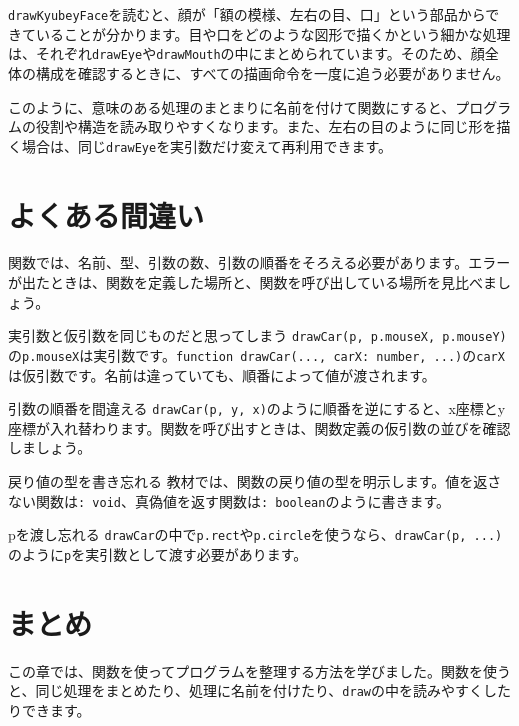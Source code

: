 \texttt{drawKyubeyFace}を読むと、顔が「額の模様、左右の目、口」という部品からできていることが分かります。目や口をどのような図形で描くかという細かな処理は、それぞれ\texttt{drawEye}や\texttt{drawMouth}の中にまとめられています。そのため、顔全体の構成を確認するときに、すべての描画命令を一度に追う必要がありません。

このように、意味のある処理のまとまりに名前を付けて関数にすると、プログラムの役割や構造を読み取りやすくなります。また、左右の目のように同じ形を描く場合は、同じ\texttt{drawEye}を実引数だけ変えて再利用できます。
\clearpage

\section{よくある間違い}

関数では、名前、型、引数の数、引数の順番をそろえる必要があります。エラーが出たときは、関数を定義した場所と、関数を呼び出している場所を見比べましょう。

\begin{mistakebox}{実引数と仮引数を同じものだと思ってしまう}
\texttt{drawCar(p, p.mouseX, p.mouseY)}の\texttt{p.mouseX}は実引数です。\texttt{function drawCar(..., carX: number, ...)}の\texttt{carX}は仮引数です。名前は違っていても、順番によって値が渡されます。
\end{mistakebox}

\begin{mistakebox}{引数の順番を間違える}
\texttt{drawCar(p, y, x)}のように順番を逆にすると、x座標とy座標が入れ替わります。関数を呼び出すときは、関数定義の仮引数の並びを確認しましょう。
\end{mistakebox}

\begin{mistakebox}{戻り値の型を書き忘れる}
教材では、関数の戻り値の型を明示します。値を返さない関数は\texttt{: void}、真偽値を返す関数は\texttt{: boolean}のように書きます。
\end{mistakebox}

\begin{mistakebox}{pを渡し忘れる}
\texttt{drawCar}の中で\texttt{p.rect}や\texttt{p.circle}を使うなら、\texttt{drawCar(p, ...)}のように\texttt{p}を実引数として渡す必要があります。
\end{mistakebox}

\section{まとめ}

この章では、関数を使ってプログラムを整理する方法を学びました。関数を使うと、同じ処理をまとめたり、処理に名前を付けたり、\texttt{draw}の中を読みやすくしたりできます。

